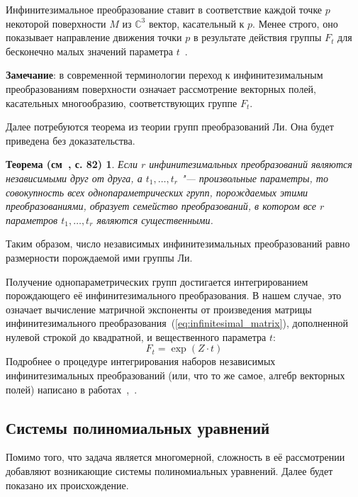 \documentclass[../main.tex]{subfiles}
\newtheorem*{lie_theorem}{Теорема (см~\cite{lie}, с. 82)}
\begin{document}
Инфинитезимальное преобразование ставит в соответствие каждой точке $p$ некоторой поверхности $M$ из $\mathbb{C}^3$ вектор, касательный к $p$. Менее строго, оно показывает направление движения точки $p$ в результате действия группы $F_t$ для бесконечно малых значений параметра $t$~\cite{lie}.

\textbf{Замечание}: в современной терминологии переход к инфинитезимальным преобразованиям поверхности означает рассмотрение векторных полей, касательных многообразию, соответствующих группе $F_t$.

Далее потребуются теорема из теории групп преобразований Ли. Она будет приведена без доказательства.
\begin{lie_theorem}\label{thm:lie}
Если $r$ инфинитезимальных преобразований являются независимыми друг от друга, а $t_1,\hdots,t_r$ "--- произвольные параметры, то совокупность всех однопараметрических групп, порождаемых этими преобразованиями, образует семейство преобразований, в котором все $r$  параметров $t_1,\hdots,t_r$ являются существенными.
\end{lie_theorem}

Таким образом, число независимых инфинитезимальных преобразований равно размерности порождаемой ими группы Ли. 

Получение однопараметрических групп достигается интегрированием порождающего её инфинитезимального преобразования. В нашем случае, это означает вычисление матричной экспоненты от произведения матрицы инфинитезимального преобразования~(\ref{eq:infinitesimal_matrix}), дополненной нулевой строкой до квадратной, и вещественного параметра $t$:
$$
	F_t = \exp(Z \cdot t)
$$
Подробнее о процедуре интегрирования наборов независимых инфинитезимальных преобразований (или, что то же самое, алгебр векторных полей) написано в работах~\cite{loboda_hodarev},~\cite{fels}.

\subsection{Системы полиномиальных уравнений}
Помимо того, что задача является многомерной, сложность в её рассмотрении добавляют возникающие системы полиномиальных уравнений. Далее будет показано их происхождение.
\end{document}
